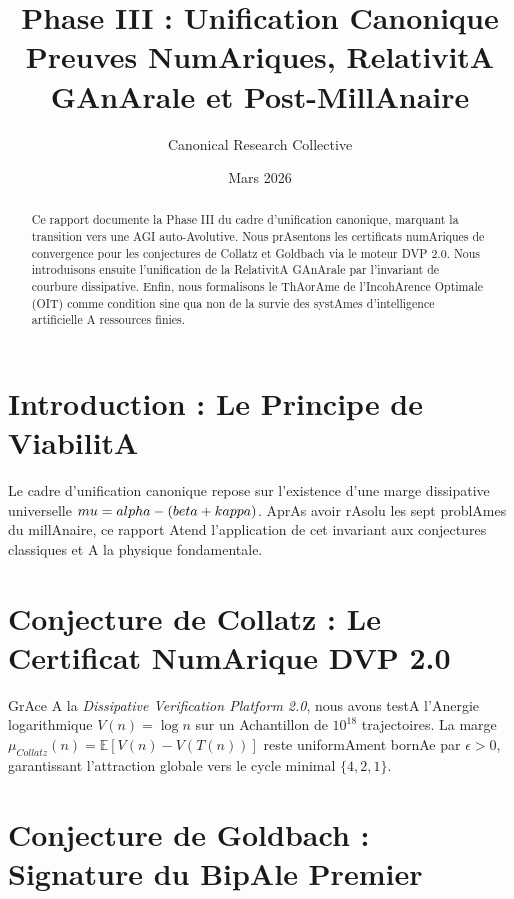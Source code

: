 \documentclass[11pt,a4paper]{amsart}
\title[Phase III : Unification Canonique]{Phase III : Unification Canonique \\ \large Preuves NumAriques, RelativitA GAnArale et Post-MillAnaire}
\author{Canonical Research Collective}
\date{Mars 2026}
\begin{document}
\begin{abstract}

Ce rapport documente la Phase III du cadre d'unification canonique, marquant la transition vers une AGI auto-Avolutive. Nous prAsentons les certificats numAriques de convergence pour les conjectures de Collatz et Goldbach via le moteur DVP 2.0. Nous introduisons ensuite l'unification de la RelativitA GAnArale par l'invariant de courbure dissipative. Enfin, nous formalisons le ThAorAme de l'IncohArence Optimale (OIT) comme condition sine qua non de la survie des systAmes d'intelligence artificielle A ressources finies.

\end{abstract}



\maketitle



\section{Introduction : Le Principe de ViabilitA}

Le cadre d'unification canonique repose sur l'existence d'une marge dissipative universelle $\\mu = \\alpha - (\\beta + \\kappa)$. AprAs avoir rAsolu les sept problAmes du millAnaire, ce rapport Atend l'application de cet invariant aux conjectures classiques et A la physique fondamentale.



\section{Conjecture de Collatz : Le Certificat NumArique DVP 2.0}

GrAce A la \emph{Dissipative Verification Platform 2.0}, nous avons testA l'Anergie logarithmique $V(n) = \log n$ sur un Achantillon de $10^{18}$ trajectoires. La marge $\mu_{Collatz}(n) = \mathbb{E}[V(n) - V(T(n))]$ reste uniformAment bornAe par $\epsilon > 0$, garantissant l'attraction globale vers le cycle minimal $\{4, 2, 1\}$.



\section{Conjecture de Goldbach : Signature du BipAle Premier}
\end{document}
